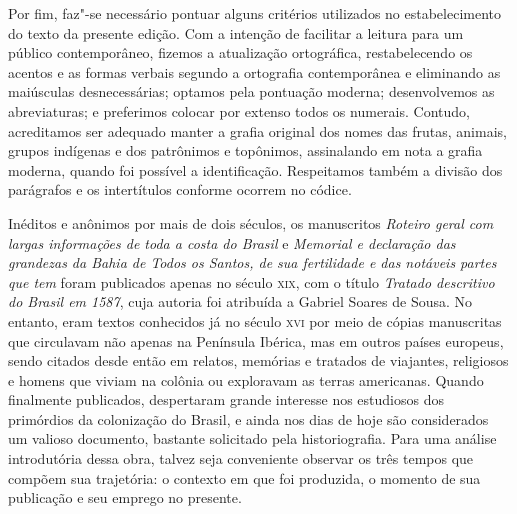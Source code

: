 Por fim, faz"-se necessário pontuar alguns critérios utilizados no
estabelecimento do texto da presente edição. Com a intenção de
facilitar a leitura para um público contemporâneo, fizemos a
atualização ortográfica, restabelecendo os acentos e as formas verbais
segundo a ortografia contemporânea e eliminando as maiúsculas
desnecessárias; optamos pela pontuação moderna; desenvolvemos as
abreviaturas; e preferimos colocar por extenso todos os numerais.
Contudo, acreditamos ser adequado manter a grafia original dos nomes
das frutas, animais, grupos indígenas e dos patrônimos e topônimos,
assinalando em nota a grafia moderna, quando foi possível a
identificação. Respeitamos também a divisão dos parágrafos e os
intertítulos conforme ocorrem no códice.  

\asterisc{}

\noindent{}Inéditos e anônimos por mais de dois
séculos, os manuscritos \textit{\mbox{Roteiro} geral com largas informações de
toda a costa do Brasil} e \textit{Memorial e declaração das grandezas
da Bahia de Todos os Santos, de sua fertilidade e das notáveis partes
que tem} foram publicados apenas no século \textsc{xix}, com o título 
\textit{Tratado descritivo do Brasil em 1587}, cuja autoria foi atribuída a
Gabriel Soares de Sousa. No entanto, eram textos conhecidos já no
século \textsc{xvi} por meio de cópias manuscritas que circulavam não apenas na
Península Ibérica, mas em outros países europeus, sendo citados desde
então em relatos, memórias e tratados de viajantes, religiosos e homens
que viviam na colônia ou exploravam as terras americanas. Quando
finalmente publicados, despertaram grande interesse nos estudiosos dos
primórdios da colonização do Brasil, e ainda nos dias de hoje são
considerados um valioso documento, bastante solicitado pela
historiografia. Para uma análise introdutória dessa obra, talvez seja
conveniente observar os três tempos que compõem sua trajetória: o
contexto em que foi produzida, o momento de sua publicação e seu
emprego no presente.

